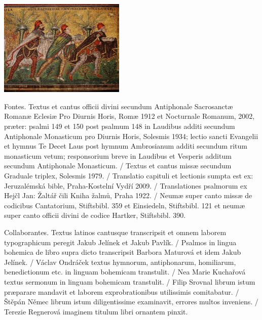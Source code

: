 \documentclass[a4paper, twoside, 12pt]{article}
\begin{document}
\vfill

\newpage
\RemoveSideThumbs
\pagestyle{empty}



\vfill

\newpage

\begin{center}
\includegraphics[width=6cm]{imagines/ravenna.jpg}
\end{center}

\vfill

Fontes.
Textus et cantus officii divini secundum
Antiphonale Sacrosanctæ Romanæ Eclesiæ Pro Diurnis Horis, Romæ 1912
et Nocturnale Romanum, 2002, præter: psalmi 149 et 150 post
psalmum 148 in Laudibus additi secundum Antiphonale Monasticum pro Diurnis Horis,
Solesmis 1934; lectio sancti Evangelii et hymnus Te Decet Laus post hymnum
Ambrosianum additi secundum ritum monasticum vetum; responsorium breve
in Laudibus et Vesperis additum secundum Antiphonale Monasticum. /
Textus et cantus missæ secundum
Graduale triplex, Solesmis 1979. /
Translatio capituli et lectionis sumpta est ex:
Jeruzalémská bible, Praha-Kostelní Vydří 2009. /
Translationes psalmorum ex
Hejčl Jan: Žaltář čili Kniha žalmů, Praha 1922. /
Neumæ super canto missæ de codicibus Cantatorium, Stiftsbibl. 359 et Einsiedeln,
Stiftsbibl. 121 et neumæ super canto officii divini de codice Hartker,
Stiftsbibl. 390.

Collaborantes.
Textus latinos cantusque transcripsit et omnem laborem typographicum peregit
Jakub Jelínek et Jakub Pavlík. /
Psalmos in lingua bohemica de libro supra dicto transcripsit
Barbora Maturová et idem Jakub Jelínek. /
Václav Ondráček textus hymnorum, antiphonarum, homiliarum, benedictionum etc.
in linguam bohemicam transtulit. /
Nea Marie Kuchařová textus sermonum in linguam bohemicam transtulit. /
Filip Srovnal librum istum præparare mandavit et laborem exprobrationibus
utilissimis comitabatur. /
Štěpán Němec librum istum diligentissime examinavit, errores multos
inveniens. /
Terezie Regnerová imaginem titulum libri ornantem pinxit.
\end{document}
